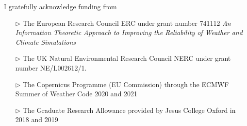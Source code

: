 \begin{funding}

I gratefully acknowledge funding from
 
\begin{itemize}
\item[$\triangleright$] The European Research Council ERC under grant number 741112 \emph{An Information Theoretic Approach to Improving the Reliability of Weather and Climate Simulations}
\item[$\triangleright$] The UK Natural Environmental Research Council NERC under grant number NE/L002612/1.
\item[$\triangleright$] The Copernicus Programme (EU Commission) through the ECMWF Summer of Weather Code 2020 and 2021
\item[$\triangleright$] The Graduate Research Allowance provided by Jesus College Oxford in 2018 and 2019
\end{itemize}

\end{funding}
